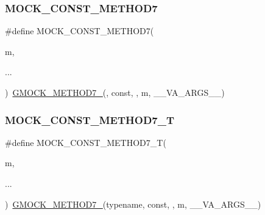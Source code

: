 \mbox{\label{_obj__test_2lib_2googletest-release-1_88_81_2googlemock_2include_2gmock_2gmock-generated-function-mockers_8h_a0f0e63ed14beab1d85f0160bdbed9930}} 
\subsubsection{\texorpdfstring{MOCK\_CONST\_METHOD7}{MOCK\_CONST\_METHOD7}}
{\footnotesize\ttfamily \#define M\+O\+C\+K\+\_\+\+C\+O\+N\+S\+T\+\_\+\+M\+E\+T\+H\+O\+D7(\begin{DoxyParamCaption}\item[{}]{m,  }\item[{}]{... }\end{DoxyParamCaption})~\mbox{\hyperlink{_obj__test_2lib_2googletest-release-1_88_81_2googlemock_2include_2gmock_2gmock-generated-function-mockers_8h_ab98a8399ba62b53b375c2807f4d39d2f}{G\+M\+O\+C\+K\+\_\+\+M\+E\+T\+H\+O\+D7\+\_\+}}(, const, , m, \+\_\+\+\_\+\+V\+A\+\_\+\+A\+R\+G\+S\+\_\+\+\_\+)}

\mbox{\label{_obj__test_2lib_2googletest-release-1_88_81_2googlemock_2include_2gmock_2gmock-generated-function-mockers_8h_a6e9ae85c17b12ba8882e06b3785d4582}} 
\subsubsection{\texorpdfstring{MOCK\_CONST\_METHOD7\_T}{MOCK\_CONST\_METHOD7\_T}}
{\footnotesize\ttfamily \#define M\+O\+C\+K\+\_\+\+C\+O\+N\+S\+T\+\_\+\+M\+E\+T\+H\+O\+D7\+\_\+T(\begin{DoxyParamCaption}\item[{}]{m,  }\item[{}]{... }\end{DoxyParamCaption})~\mbox{\hyperlink{_obj__test_2lib_2googletest-release-1_88_81_2googlemock_2include_2gmock_2gmock-generated-function-mockers_8h_ab98a8399ba62b53b375c2807f4d39d2f}{G\+M\+O\+C\+K\+\_\+\+M\+E\+T\+H\+O\+D7\+\_\+}}(typename, const, , m, \+\_\+\+\_\+\+V\+A\+\_\+\+A\+R\+G\+S\+\_\+\+\_\+)}

